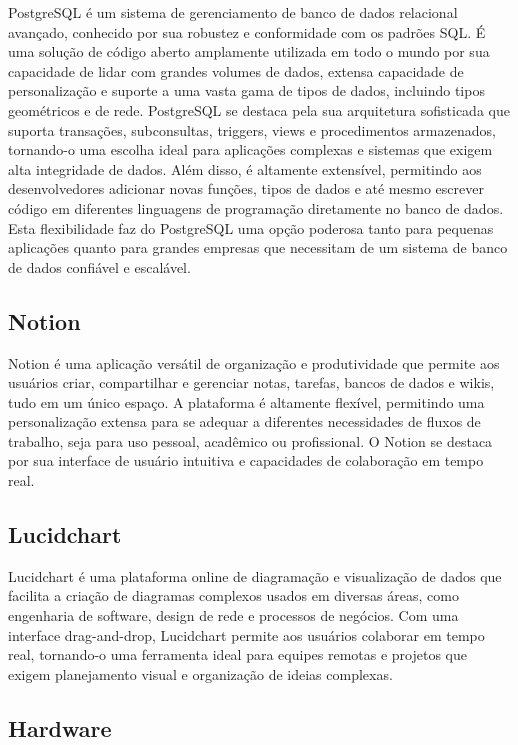 PostgreSQL é um sistema de gerenciamento de banco de dados relacional avançado, conhecido por sua robustez e conformidade com os padrões SQL. É uma solução de código aberto amplamente utilizada em todo o mundo por sua capacidade de lidar com grandes volumes de dados, extensa capacidade de personalização e suporte a uma vasta gama de tipos de dados, incluindo tipos geométricos e de rede. PostgreSQL se destaca pela sua arquitetura sofisticada que suporta transações, subconsultas, triggers, views e procedimentos armazenados, tornando-o uma escolha ideal para aplicações complexas e sistemas que exigem alta integridade de dados. Além disso, é altamente extensível, permitindo aos desenvolvedores adicionar novas funções, tipos de dados e até mesmo escrever código em diferentes linguagens de programação diretamente no banco de dados. Esta flexibilidade faz do PostgreSQL uma opção poderosa tanto para pequenas aplicações quanto para grandes empresas que necessitam de um sistema de banco de dados confiável e escalável.

\subsection{Notion}

Notion é uma aplicação versátil de organização e produtividade que permite aos usuários criar, compartilhar e gerenciar notas, tarefas, bancos de dados e wikis, tudo em um único espaço. A plataforma é altamente flexível, permitindo uma personalização extensa para se adequar a diferentes necessidades de fluxos de trabalho, seja para uso pessoal, acadêmico ou profissional. O Notion se destaca por sua interface de usuário intuitiva e capacidades de colaboração em tempo real. 

\subsection{Lucidchart}

Lucidchart é uma plataforma online de diagramação e visualização de dados que facilita a criação de diagramas complexos usados em diversas áreas, como engenharia de software, design de rede e processos de negócios. Com uma interface drag-and-drop, Lucidchart permite aos usuários colaborar em tempo real, tornando-o uma ferramenta ideal para equipes remotas e projetos que exigem planejamento visual e organização de ideias complexas.


\subsection{Hardware}

